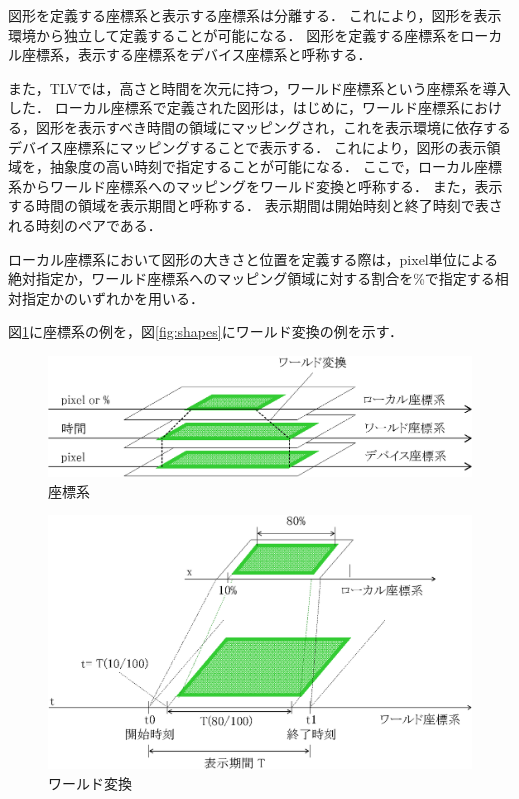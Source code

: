 図形を定義する座標系と表示する座標系は分離する．
これにより，図形を表示環境から独立して定義することが可能になる．
図形を定義する座標系をローカル座標系，表示する座標系をデバイス座標系と呼称する．

また，TLVでは，高さと時間を次元に持つ，ワールド座標系という座標系を導入した．
ローカル座標系で定義された図形は，はじめに，ワールド座標系における，図形を表示すべき時間の領域にマッピングされ，これを表示環境に依存するデバイス座標系にマッピングすることで表示する．
これにより，図形の表示領域を，抽象度の高い時刻で指定することが可能になる．
ここで，ローカル座標系からワールド座標系へのマッピングをワールド変換と呼称する．
また，表示する時間の領域を表示期間と呼称する．
表示期間は開始時刻と終了時刻で表される時刻のペアである．

ローカル座標系において図形の大きさと位置を定義する際は，pixel単位による絶対指定か，ワールド座標系へのマッピング領域に対する割合を\%で指定する相対指定かのいずれかを用いる．

図\ref{fig:coordinate}に座標系の例を，図\ref{fig:shapes}にワールド変換の例を示す．

\begin{figure}[p]
\begin{center}
\includegraphics[scale=0.75]{img/coordinate.eps}
\caption{座標系}
\label{fig:coordinate}
\end{center}
\end{figure}

\begin{figure}[p]
\begin{center}
\includegraphics[scale=0.75]{img/worldTransform.eps}
\caption{ワールド変換}
\label{fig:worldTransform}
\end{center}
\end{figure}

